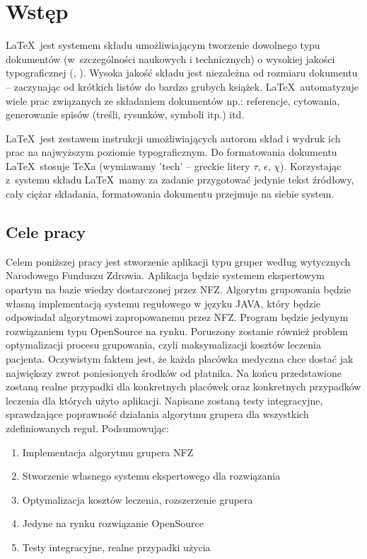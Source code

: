 \chapter{Wstęp}
\label{cha:wstep}

\LaTeX~jest systemem składu umożliwiającym tworzenie dowolnego typu dokumentów (w~szczególności naukowych i technicznych) o wysokiej jakości typograficznej (\cite{Dil00}, \cite{Lam92}). Wysoka jakość składu jest niezależna od rozmiaru dokumentu -- zaczynając od krótkich listów do bardzo grubych książek. \LaTeX~automatyzuje wiele prac związanych ze składaniem dokumentów np.: referencje, cytowania, generowanie spisów (treśli, rysunków, symboli itp.) itd.

\LaTeX~jest zestawem instrukcji umożliwiających autorom skład i wydruk ich prac na najwyższym poziomie typograficznym. Do formatowania dokumentu \LaTeX~stosuje \TeX a (wymiawamy 'tech' -- greckie litery $\tau$, $\epsilon$, $\chi$). Korzystając z~systemu składu \LaTeX~mamy za zadanie przygotować jedynie tekst źródłowy, cały ciężar składania, formatowania dokumentu przejmuje na siebie system.


\section{Cele pracy}
\label{sec:celePracy}

Celem poniższej pracy jest stworzenie aplikacji typu gruper według wytycznych Narodowego Funduszu Zdrowia. Aplikacja będzie systemem ekspertowym opartym na bazie wiedzy dostarczonej przez NFZ. Algorytm grupowania będzie własną implementacją systemu regułowego w języku JAVA, który będzie odpowiadał algorytmowi zapropowanemu przez NFZ. Program będzie jedynym rozwiązaniem typu OpenSource na rynku. Poruszony zostanie również problem optymalizacji procesu grupowania, czyli maksymalizacji kosztów leczenia pacjenta. Oczywistym faktem jest, że każda placówka medyczna chce dostać jak największy zwrot poniesionych środków od płatnika. Na końcu przedstawione zostaną realne przypadki dla konkretnych placówek oraz konkretnych przypadków leczenia dla których użyto aplikacji. Napisane zostaną testy integracyjne, sprawdzające poprawność działania algorytmu grupera dla wszystkich zdefiniowanych reguł. 
Podsumowując:
\begin{enumerate}
\item Implementacja algorytmu grupera NFZ
\item Stworzenie własnego systemu ekspertowego dla rozwiązania
\item Optymalizacja kosztów leczenia, rozszerzenie grupera
\item Jedyne na rynku rozwiązanie OpenSource
\item Testy integracyjne, realne przypadki użycia
\end{enumerate}


